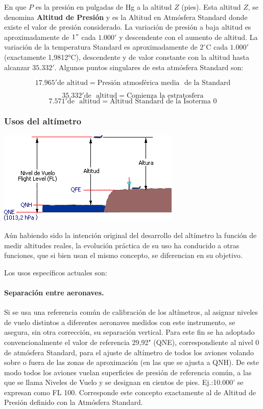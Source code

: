 \documentclass{article}
\begin{document}
En que $P$ es la presión en pulgadas de Hg a la altitud $Z$ (pies). Esta altitud $Z$, se denomina \textbf{Altitud de Presión} y es la Altitud en Atmósfera Standard donde existe el valor de presión considerado.
La variación de presión a baja altitud es aproximadamente de $1"$ cada $1.000'$ y descendente con el aumento de altitud.
La variación de la temperatura Standard es aproximadamente de $2^{\circ}\mathrm{C}$ cada $1.000'$ (exactamente 1,9812°C), descendente y de valor constante con la altitud hasta alcanzar $35.332'$.
Algunos puntos singulares de esta atmósfera Standard son:


$$17.965' \text{de~altitud} = \text{Presión atmosférica media~ de la Standard}$$

$$35.332' \text{de~ altitud}  = \text{Comienza la estratosfera}$$
\begin{equation}
7.571' \text{de~ altitud}  = \text{Altitud Standard de la Isoterma 0}
\end{equation}
\subsubsection*{Usos del altímetro}
\begin{center}
\includegraphics[scale=0.75]{figuras/alturas.png}
\label{fig:alturas}
\end{center}

Aún habiendo sido la intención original del desarrollo del altímetro la función de medir altitudes reales, la evolución práctica de su uso ha conducido a otras funciones, que si bien usan el mismo concepto, se diferencian en su objetivo.

Los usos específicos actuales son:
\paragraph{Separación entre aeronaves.}
Si se usa una referencia común de calibración de los altímetros, al asignar niveles de vuelo distintos a diferentes aeronaves medidos con este instrumento, se asegura, sin otra corrección, su separación vertical.
Para este fin se ha adoptado convencionalmente el valor de referencia 29,92" (QNE), correspondiente al nivel 0 de atmósfera Standard, para el ajuste de altímetro de todos los aviones volando sobre o fuera de las zonas de
aproximación (en las que se ajusta a QNH). De este modo todos los aviones vuelan superficies de presión de referencia común, a las que se llama Niveles de Vuelo y se designan en cientos de pies. Ej.:10.000' se expresan como FL 100.
Corresponde este concepto exactamente al de Altitud de Presión definido con la Atmósfera Standard.
\end{document}
